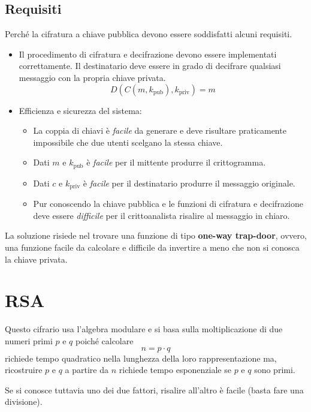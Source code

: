 \subsection{Requisiti}
Perch\'e la cifratura a chiave pubblica devono essere soddisfatti alcuni requisiti.
\begin{itemize}
	\item Il procedimento di cifratura e decifrazione devono essere implementati correttamente. Il destinatario deve essere
	      in grado di decifrare qualsiasi messaggio con la propria chiave privata.
	      \[ D(C(m, k_{\text{pub}}), k_{\text{priv}}) = m \]
	\item Efficienza e sicurezza del sistema:
	      \begin{itemize}
		      \item La coppia di chiavi \`e \emph{facile} da generare e deve risultare praticamente impossibile che due
		            utenti scelgano la stessa chiave.
		      \item Dati $m$ e $k_{\text{pub}}$ \`e \emph{facile} per il mittente produrre il crittogramma.
		      \item Dati $c$ e $k_{\text{priv}}$ \`e \emph{facile} per il destinatario produrre il messaggio originale.
		      \item Pur conoscendo la chiave pubblica e le funzioni di cifratura e decifrazione deve essere
		            \emph{difficile} per il crittoanalista risalire al messaggio in chiaro.
	      \end{itemize}
\end{itemize}
La soluzione risiede nel trovare una funzione di tipo \textbf{one-way trap-door}, ovvero, una funzione facile da calcolare
e difficile da invertire a meno che non si conosca la chiave privata.

\section{RSA}
Questo cifrario usa l'algebra modulare e si basa sulla moltiplicazione di due numeri primi $p$ e $q$ poich\'e calcolare
\[ n = p \cdot q \]
richiede tempo quadratico nella lunghezza della loro rappresentazione ma, ricostruire $p$ e $q$ a partire da $n$ richiede
tempo esponenziale se $p$ e $q$ sono primi.

Se si conosce tuttavia uno dei due fattori, risalire all'altro \`e facile (basta fare una divisione).

